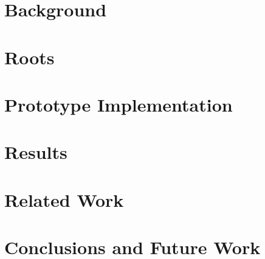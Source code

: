 \documentclass[10pt,journal,compsoc]{IEEEtran}
\begin{document}
\maketitle

\IEEEdisplaynontitleabstractindextext

\IEEEpeerreviewmaketitle





\section{Background}
\label{sec:background}


\section{Roots}
\label{sec:arch}


\section{Prototype Implementation}
\label{sec:impl}


\section{Results}
\label{sec:results}


\section{Related Work}


\section{Conclusions and Future Work}


%
 
\end{document}
